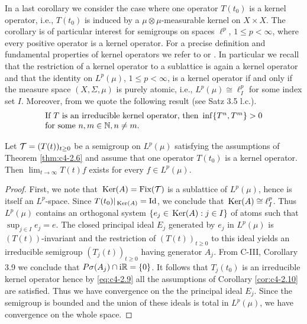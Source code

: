 In a last corollary we consider the case where one operator $T(t_{0})$ is a kernel operator, i.e., $T(t_{0})$ is induced by a $\mu \otimes \mu$-measurable kernel on $X \times X$.
The corollary is of particular interest for semigroups on spaces $\ell^{p}$, $1 \leq p < \infty$, where every positive operator is a kernel operator.
For a precise definition and fundamental properties of kernel operators we refer to \citet[Section IV.9]{schaefer:1974} or \citet[Chapter 13]{zaanen:1983}.
In particular we recall that the restriction of a kernel operator to a sublattice is again a kernel operator and that
the identity on $L^{p}(\mu)$, $1 \leq p < \infty$, is a kernel operator if and only if the measure space $(X,\Sigma,\mu)$ is purely atomic, i.e., $L^{p}(\mu) \cong \ell^{p}_{I}$ for some index set $I$.
Moreover, from \citet{axmann:1980} we quote the following result (see Satz 3.5 l.c.).
\begin{equation}\label{eq:c4-2.9}
\begin{array}{l}
\text{If } T \text{ is an irreducible kernel operator, then } \inf\{T^{n},T^{m}\} > 0\\ \text{for some } n, m \in \mathbb{N}, n \neq m.
\end{array}
\end{equation}
\begin{corollary}\label{cor:c4-2.11}
Let $\mathcal{T} = (T(t))_{t\geq 0}$ be a semigroup on $L^{p}(\mu)$ satisfying the assumptions of Theorem \ref{thm:c4-2.6} and assume that one operator $T(t_{0})$ is a kernel operator.
Then $\lim_{t \to \infty}T(t)f$ exists for every $f \in L^{p}(\mu)$.
\end{corollary}

\begin{proof}
First, we note that $\mathop{}\mathrm{Ker}(A) = \text{Fix}(\mathcal{T})$ is a sublattice of $L^{p}(\mu)$, hence is itself an $L^{p}$-space.
Since $T(t_{0})|_{\mathop{}\mathrm{Ker}(A)} = \operatorname{Id}$, we conclude that $\mathop{}\mathrm{Ker}(A) \cong \ell^{p}_{I}$.
Thus $L^{p}(\mu)$ contains an orthogonal system $\{e_{j} \in \mathop{}\mathrm{Ker}(A): j \in I\}$ of atoms such that $\sup_{j\in I}e_{j} = e$.
The closed principal ideal $E_{j}$ generated by $e_{j}$ in $L^{p}(\mu)$ is $(T(t))$-invariant and the restriction of $(T(t))_{t \geq 0}$ to this ideal yields an irreducible semigroup $(T_{j}(t))_{t \geq 0}$ having generator $A_{j}$.
From C-III, Corollary 3.9
we conclude that $P{\sigma}(A_{j})\cap \mathrm{i}\mathbb{R} = \{0\}$.
It follows that $T_{j}(t_{0})$ is an irreducible kernel operator hence by \eqref{eq:c4-2.9} all the assumptions of Corollary \ref{cor:c4-2.10} are satisfied.
Thus we have convergence on the the principal ideal $E_{j}$.
Since the semigroup is bounded and the union of these ideals is total in $L^{p}(\mu)$, we have convergence on the whole space.
\end{proof}

